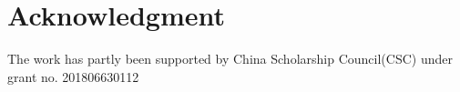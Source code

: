 \section*{Acknowledgment}
The work has partly been supported by China Scholarship
Council(CSC) under grant no. 201806630112
